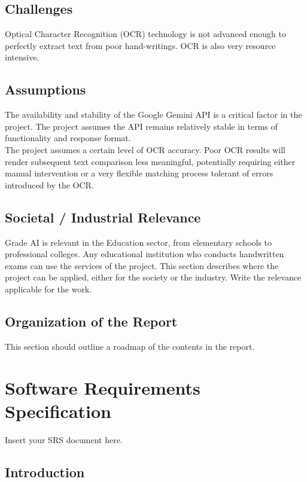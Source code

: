 \documentclass[12pt,a4paper,titlepage]{report}
\begin{document}
	\section{Challenges}
	
	Optical Character Recognition (OCR) technology is not advanced enough to perfectly extract text from poor hand-writings. OCR is also very resource intensive. 
	
	
	\section{Assumptions}
	
	The availability and stability of the Google Gemini API is a critical factor in the project. The project assumes the API remains relatively stable in terms of functionality and response format.\\
    The project assumes a certain level of OCR accuracy. Poor OCR results will render subsequent text comparison less meaningful, potentially requiring either manual intervention or a very flexible matching process tolerant of errors introduced by the OCR.
	
	
	\section{Societal / Industrial Relevance}

    Grade AI is relevant in the Education sector, from elementary schools to professional colleges.
    Any educational institution who conducts handwritten exams can use the services of the project.
	This section describes where the project can be applied, either for the society or the industry. Write the relevance applicable for the work.
	
	\section{Organization of the Report}
	
	This section should outline a roadmap of the contents in the report.
	
	
	
	
	
	
	
	\chapter{Software Requirements Specification}
	Insert your SRS document here.
	
	\section{Introduction}
\end{document}
